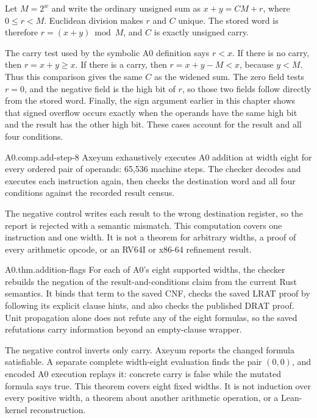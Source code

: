 \begin{proofkit}[title={Why addition determines all five output fields}]
Let \(M=2^w\) and write the ordinary unsigned sum as
\(x+y=CM+r\), where \(0\leq r<M\). Euclidean division makes \(r\) and
\(C\) unique. The stored word is therefore \(r=(x+y)\bmod M\), and \(C\)
is exactly unsigned carry.

The carry test used by the symbolic A0 definition says \(r<x\). If there is
no carry, then \(r=x+y\geq x\). If there is a carry, then
\(r=x+y-M<x\), because \(y<M\). Thus this comparison gives the same \(C\)
as the widened sum. The zero field tests \(r=0\), and the negative field is
the high bit of \(r\), so those two fields follow directly from the stored
word. Finally, the sign argument earlier in this chapter shows that signed
overflow occurs exactly when the operands have the same high bit and the
result has the other high bit. These cases account for the result and all four
conditions.
\end{proofkit}

\begin{artifact}{A0.comp.add-step-8}
Axeyum exhaustively executes A0 addition at width eight for every ordered pair
of operands: 65,536 machine steps. The checker decodes and executes each
instruction again, then checks the destination word and all four conditions
against the recorded result census.

The negative control writes each result to the wrong destination register, so
the report is rejected with a semantic mismatch. This computation covers one
instruction and one width. It is not a theorem for arbitrary widths, a proof
of every arithmetic opcode, or an RV64I or x86-64 refinement result.
\end{artifact}

\begin{artifact}{A0.thm.addition-flags}
For each of A0's eight supported widths, the checker rebuilds the negation of
the result-and-conditions claim from the current Rust semantics. It binds that
term to the saved CNF, checks the saved LRAT proof by following its explicit
clause hints, and also checks the published DRAT proof.
Unit propagation alone does not refute any of the eight formulas, so the saved
refutations carry information beyond an empty-clause wrapper.

The negative control inverts only carry. Axeyum reports the changed formula
satisfiable. A separate complete width-eight evaluation finds the pair
\((0,0)\), and encoded A0 execution replays it: concrete carry is false while
the mutated formula says true. This theorem covers eight fixed widths. It is
not induction over every positive width, a theorem about another arithmetic
operation, or a Lean-kernel reconstruction.
\end{artifact}

